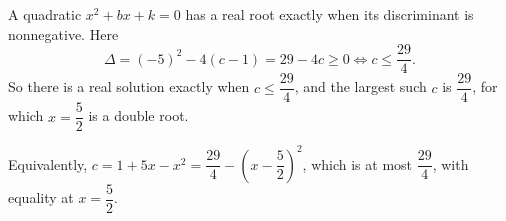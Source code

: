 A quadratic $x^2+bx+k=0$ has a real root exactly when its discriminant is nonnegative. Here
\[
\Delta=(-5)^2-4(c-1)=29-4c\ge0\iff c\le\dfrac{29}{4}.
\]
So there is a real solution exactly when $c\le\dfrac{29}{4}$, and the largest such $c$ is $\boxed{\dfrac{29}{4}}$, for which $x=\dfrac{5}{2}$ is a double root.

Equivalently, $c=1+5x-x^2=\dfrac{29}{4}-\left(x-\dfrac{5}{2}\right)^2$, which is at most $\dfrac{29}{4}$, with equality at $x=\dfrac{5}{2}$.
